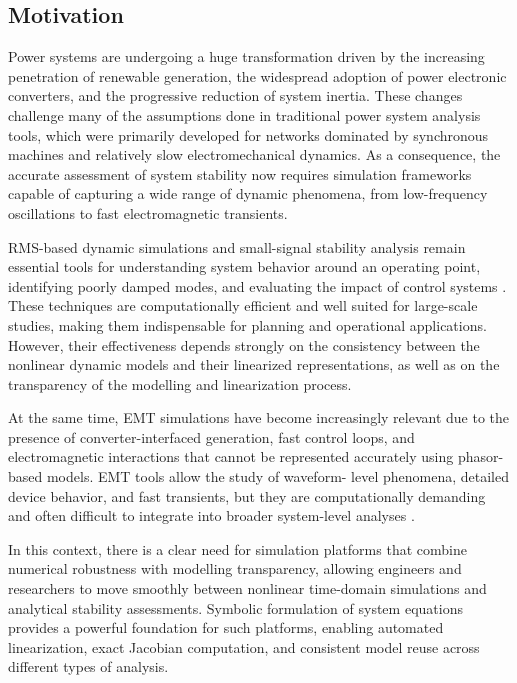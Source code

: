
\subsection{Motivation}

Power systems are undergoing a huge transformation driven by the increasing penetration
of renewable generation, the widespread adoption of power electronic converters, and the
progressive reduction of system inertia. These changes challenge many of the assumptions
done in traditional power system analysis tools, which were primarily developed for
networks dominated by synchronous machines and relatively slow electromechanical dynamics.
As a consequence, the accurate assessment of system stability now requires simulation
frameworks capable of capturing a wide range of dynamic phenomena, from low-frequency
oscillations to fast electromagnetic transients.

RMS-based dynamic simulations and small-signal stability analysis remain essential tools for
understanding system behavior around an operating point, identifying poorly damped modes,
and evaluating the impact of control systems \cite{StabilityAndControlKundur}. These techniques are computationally efficient
and well suited for large-scale studies, making them indispensable for planning and operational
applications. However, their effectiveness depends strongly on the consistency between the
nonlinear dynamic models and their linearized representations, as well as on the transparency
of the modelling and linearization process.

At the same time, EMT simulations have become increasingly relevant due to the presence of
converter-interfaced generation, fast control loops, and electromagnetic interactions that cannot
be represented accurately using phasor-based models. EMT tools allow the study of waveform-
level phenomena, detailed device behavior, and fast transients, but they are computationally
demanding and often difficult to integrate into broader system-level analyses \cite{WatsonArrillagaEMT2019}.

In this context, there is a clear need for simulation platforms that combine numerical robustness
with modelling transparency, allowing engineers and researchers to move smoothly between
nonlinear time-domain simulations and analytical stability assessments. Symbolic formulation
of system equations provides a powerful foundation for such platforms, enabling automated
linearization, exact Jacobian computation, and consistent model reuse across different types of
analysis.

